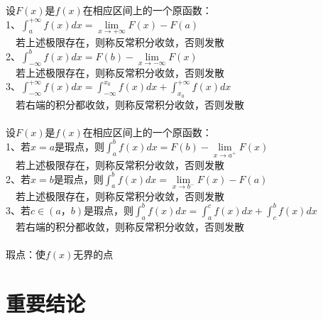 \documentclass{article}
\begin{document}
\begin{flushleft}
	设$F(x)$是$f(x)$在相应区间上的一个原函数：\\
	1、$\int_{a}^{+\infty}f(x)dx=\lim\limits_{x\to+\infty}F(x)-F(a)$\\
	\ \ 若上述极限存在，则称反常积分收敛，否则发散\\
	2、$\int_{-\infty}^{b}f(x)dx=F(b)-\lim\limits_{x\to-\infty}F(x)$\\
	\ \ 若上述极限存在，则称反常积分收敛，否则发散\\
	3、$\int_{-\infty}^{+\infty}f(x)dx=\int_{-\infty}^{x_0}f(x)dx+\int_{x_0}^{+\infty}f(x)dx$\\
	\ \ 若右端的积分都收敛，则称反常积分收敛，否则发散\\
	~\\
	设$F(x)$是$f(x)$在相应区间上的一个原函数：\\
	1、若$x=a$是瑕点，则$\int_{a}^{b}f(x)dx=F(b)-\lim\limits_{x\to a^+}F(x)$\\
	\ \ 若上述极限存在，则称反常积分收敛，否则发散\\
	2、若$x=b$是瑕点，则$\int_{a}^{b}f(x)dx=\lim\limits_{x\to b^-}F(x)-F(a)$\\
	\ \ 若上述极限存在，则称反常积分收敛，否则发散\\
	3、若$c\in(a，b)$是瑕点，则$\int_{a}^{b}f(x)dx=\int_{a}^{c}f(x)dx+\int_{c}^{b}f(x)dx$\\
	\ \ 若右端的积分都收敛，则称反常积分收敛，否则发散\\
	~\\
	瑕点：使$f(x)$无界的点\\
	
	\section{重要结论}
	

\end{flushleft}
\end{document}
